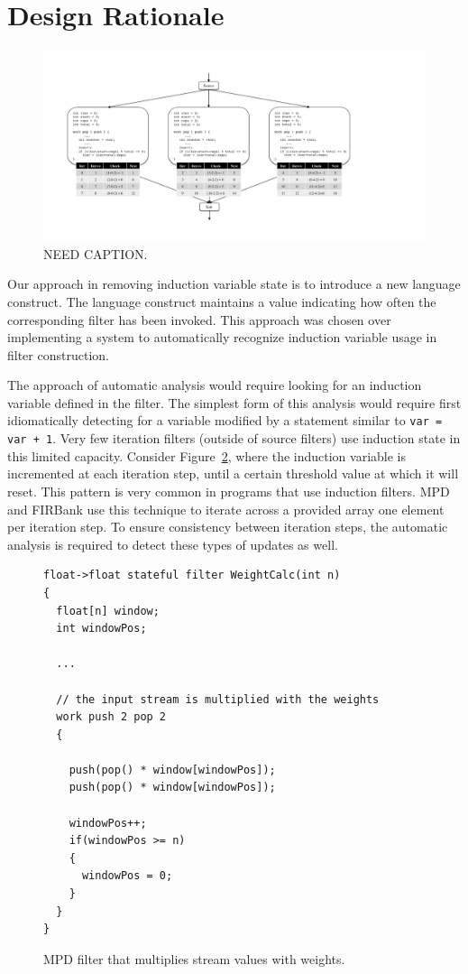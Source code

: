\section{Design Rationale}

\begin{figure}[t!]
\centering
\includegraphics[width=6.5in]{figures/fission-example.pdf}
\caption{NEED CAPTION.\protect\label{fig:fission-example}}
\end{figure}

Our approach in removing induction variable state is to introduce a new language construct.  The language construct maintains a value indicating how often the corresponding filter has been invoked.  This approach was chosen over implementing a system to automatically recognize induction variable usage in filter construction.

The approach of automatic analysis would require looking for an induction variable defined in the filter.  The simplest form of this analysis would require first idiomatically detecting for a variable modified by a statement similar to \texttt{var = var + 1}.  Very few iteration filters (outside of source filters) use induction state in this limited capacity.  Consider Figure~\ref{fig:weight-calc}, where the induction variable is incremented at each iteration step, until a certain threshold value at which it will reset.  This pattern is very common in programs that use induction filters.  MPD and FIRBank use this technique to iterate across a provided array one element per iteration step.  To ensure consistency between iteration steps, the automatic analysis is required to detect these types of updates as well.  

\begin{figure}[t]
{\eightpoint
\begin{verbatim}
float->float stateful filter WeightCalc(int n)
{
  float[n] window;
  int windowPos;

  ...

  // the input stream is multiplied with the weights
  work push 2 pop 2
  {

    push(pop() * window[windowPos]);
    push(pop() * window[windowPos]);

    windowPos++;
    if(windowPos >= n)
    {
      windowPos = 0;
    }
  }
}
\end{verbatim}
\caption{MPD filter that multiplies stream values with weights.\protect\label{fig:weight-calc}}}
\end{figure}

